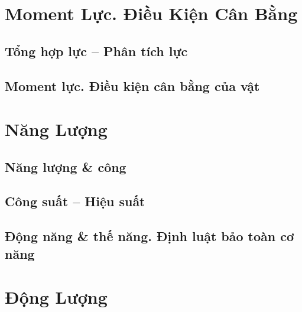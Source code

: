 \documentclass{article}
\numberwithin{equation}{section}
\begin{document}

\section{Moment Lực. Điều Kiện Cân Bằng}

\subsection{Tổng hợp lực -- Phân tích lực}


\subsection{Moment lực. Điều kiện cân bằng của vật}


\section{Năng Lượng}

\subsection{Năng lượng \& công}


\subsection{Công suất -- Hiệu suất}


\subsection{Động năng \& thế năng. Định luật bảo toàn cơ năng}


\section{Động Lượng}
\end{document}
